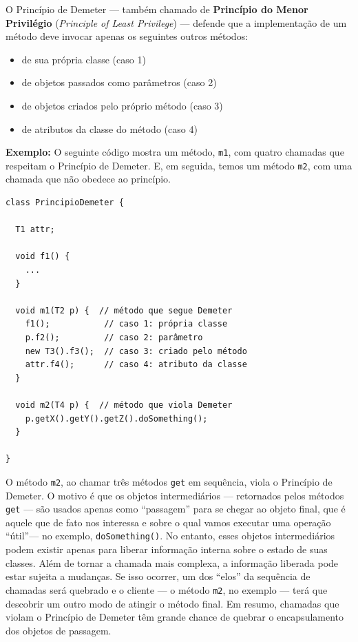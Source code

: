 \documentclass[
  11pt,
  twoside]{book}
\newcommand{\passthrough}[1]{#1}
\begin{document}
O Princípio de Demeter --- também chamado de \textbf{Princípio do Menor
Privilégio} (\emph{Principle of Least Privilege}) --- defende que a
implementação de um método deve invocar apenas os seguintes outros
métodos:

\begin{itemize}
\item
  de sua própria classe (caso 1)
\item
  de objetos passados como parâmetros (caso 2)
\item
  de objetos criados pelo próprio método (caso 3)
\item
  de atributos da classe do método (caso 4)
\end{itemize}

\textbf{Exemplo:} O seguinte código mostra um método,
\passthrough{\lstinline!m1!}, com quatro chamadas que respeitam o
Princípio de Demeter. E, em seguida, temos um método
\passthrough{\lstinline!m2!}, com uma chamada que não obedece ao
princípio.

\begin{lstlisting}
class PrincipioDemeter {

  T1 attr;

  void f1() { 
    ...
  }

  void m1(T2 p) {  // método que segue Demeter
    f1();           // caso 1: própria classe
    p.f2();         // caso 2: parâmetro
    new T3().f3();  // caso 3: criado pelo método
    attr.f4();      // caso 4: atributo da classe
  }

  void m2(T4 p) {  // método que viola Demeter
    p.getX().getY().getZ().doSomething();
  }

}
\end{lstlisting}

O método \passthrough{\lstinline!m2!}, ao chamar três métodos
\passthrough{\lstinline!get!} em sequência, viola o Princípio de
Demeter. O motivo é que os objetos intermediários --- retornados pelos
métodos \passthrough{\lstinline!get!} --- são usados apenas como
``passagem'' para se chegar ao objeto final, que é aquele que de fato
nos interessa e sobre o qual vamos executar uma operação ``útil''--- no
exemplo, \passthrough{\lstinline!doSomething()!}. No entanto, esses
objetos intermediários podem existir apenas para liberar informação
interna sobre o estado de suas classes. Além de tornar a chamada mais
complexa, a informação liberada pode estar sujeita a mudanças. Se isso
ocorrer, um dos ``elos'' da sequência de chamadas será quebrado e o
cliente --- o método \passthrough{\lstinline!m2!}, no exemplo --- terá
que descobrir um outro modo de atingir o método final. Em resumo,
chamadas que violam o Princípio de Demeter têm grande chance de quebrar
o encapsulamento dos objetos de passagem.
\end{document}
